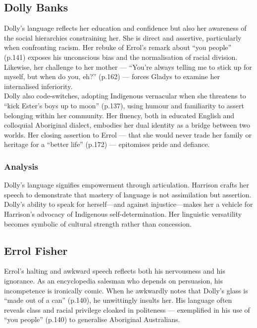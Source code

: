 \documentclass[a4paper]{article}
\begin{document}
\subsection{Dolly Banks}
Dolly’s language reflects her education and confidence but also her awareness of the social hierarchies constraining her. She is direct and assertive, particularly when confronting racism. Her rebuke of Errol’s remark about “you people” (p.141) exposes his unconscious bias and the normalisation of racial division. Likewise, her challenge to her mother — “You’re always telling me to stick up for myself, but when do you, eh?” (p.162) — forces Gladys to examine her internalised inferiority.\\

Dolly also code-switches, adopting Indigenous vernacular when she threatens to “kick Ester’s boys up to moon” (p.137), using humour and familiarity to assert belonging within her community. Her fluency, both in educated English and colloquial Aboriginal dialect, embodies her dual identity as a bridge between two worlds. Her closing assertion to Errol — that she would never trade her family or heritage for a “better life” (p.172) — epitomises pride and defiance.\\

\subsubsection{Analysis}
Dolly’s language signifies empowerment through articulation. Harrison crafts her speech to demonstrate that mastery of language is not assimilation but assertion. Dolly’s ability to speak for herself—and against injustice—makes her a vehicle for Harrison’s advocacy of Indigenous self-determination. Her linguistic versatility becomes symbolic of cultural strength rather than concession.\\



\subsection{Errol Fisher}
Errol’s halting and awkward speech reflects both his nervousness and his ignorance. As an encyclopedia salesman who depends on persuasion, his incompetence is ironically comic. When he awkwardly notes that Dolly’s glass is “made out of a can” (p.140), he unwittingly insults her. His language often reveals class and racial privilege cloaked in politeness — exemplified in his use of “you people” (p.140) to generalise Aboriginal Australians.\\
\end{document}
